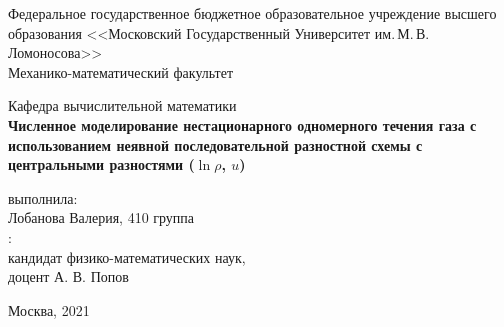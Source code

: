 \begin{titlepage}
	\begin{center}
		Федеральное государственное бюджетное образовательное учреждение высшего образования 
		<<Московский Государственный Университет им.\,М.\,В.\,Ломоносова>>\\

		Механико-математический факультет

		Кафедра вычислительной математики\\[5cm]


		{\bf Численное моделирование нестационарного одномерного течения газа с использованием неявной последовательной разностной схемы с центральными разностями ($\ln{\rho}$, $u$)\\[0.5cm]}


		\vspace{3cm}
		\begin{flushright}
			{ выполнила:}\\
			Лобанова Валерия, 410 группа\\[0.5cm]
			{:}\\
			кандидат физико-математических наук,\\
			доцент А. В. Попов\\
		\end{flushright}
		\vspace{2,5cm}

		\normalsize Москва, 2021
	\end{center}
\end{titlepage}
